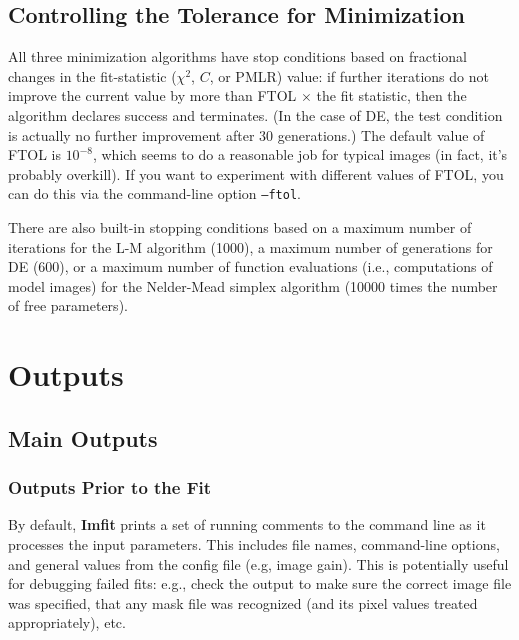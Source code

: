 \documentclass[10pt,a4paper,article]{memoir}
\newcommand{\imfit}{\textbf{Imfit}}
\newcommand{\chisquare}{\ensuremath{\chi^{2}}}
\newcommand{\pmlr}{PMLR}
\begin{document}
\section{Controlling the Tolerance for Minimization}

All three minimization algorithms have stop conditions based on
fractional changes in the fit-statistic (\chisquare{}, $C$, or \pmlr)
value: if further iterations do not improve the current value by more
than FTOL $\times$ the fit statistic, then the algorithm declares success and
terminates. (In the case of DE, the test condition is actually no
further improvement after 30 generations.) The default value of FTOL is
$10^{-8}$, which seems to do a reasonable job for typical images (in
fact, it's probably overkill). If you want to experiment with different
values of FTOL, you can do this via the command-line option
\texttt{--ftol}.

There are also built-in stopping conditions based on a maximum number of
iterations for the L-M algorithm (1000), a maximum number of generations for DE
(600), or a maximum number of function evaluations (i.e., computations of model
images) for the Nelder-Mead simplex algorithm (10000 times the number of free
parameters).





\newpage

\chapter{Outputs}

\section{Main Outputs}

\subsection{Outputs Prior to the Fit}

By default, \imfit{} prints a set of running comments to the command
line as it processes the input parameters. This includes file names,
command-line options, and general values from the config file (e.g,
image gain). This is potentially useful for debugging failed fits: e.g.,
check the output to make sure the correct image file was specified, that
any mask file was recognized (and its pixel values treated
appropriately), etc.
\end{document}
